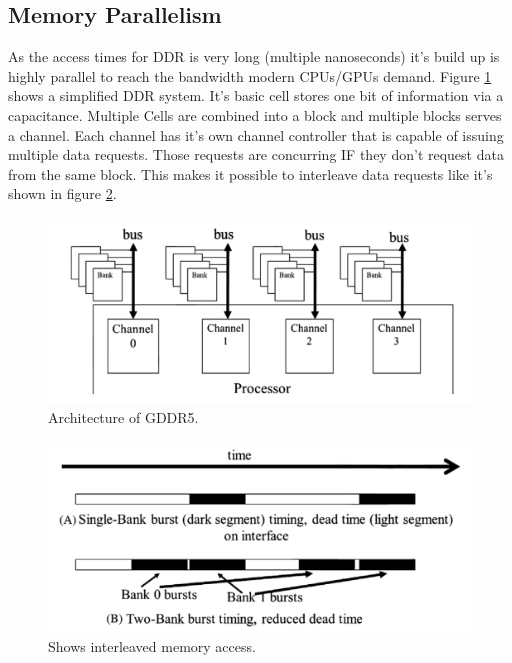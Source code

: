 \subsection{Memory Parallelism}
As the access times for DDR is very long (multiple nanoseconds) it's build up is highly parallel to reach the bandwidth modern CPUs/GPUs demand. Figure \ref{fig:gpuChannels} shows a simplified DDR system. It's basic cell stores one bit of information via a capacitance. Multiple Cells are combined into a block and multiple blocks serves a channel. Each channel has it's own channel controller that is capable of issuing multiple data requests. Those requests are concurring IF they don't request data from the same block. This makes it possible to interleave data requests like it's shown in figure \ref{fig:gpuInterleave}.
\begin{figure}[H]
	\centering
	\includegraphics[width=\textwidth]{imgs/channeksbanks.png}
	\caption[Figure]{Architecture of GDDR5. \cite[Parallel Computing Book, p. 112]{ParaComputation}}
	\label{fig:gpuChannels}
\end{figure}
\begin{figure}[H]
	\centering
	\includegraphics[width=\textwidth]{imgs/interleaveDDR.png}
	\caption[Figure]{Shows interleaved memory access.\cite[Parallel Computing Book, p. 113]{ParaComputation}}
	\label{fig:gpuInterleave}
\end{figure}


